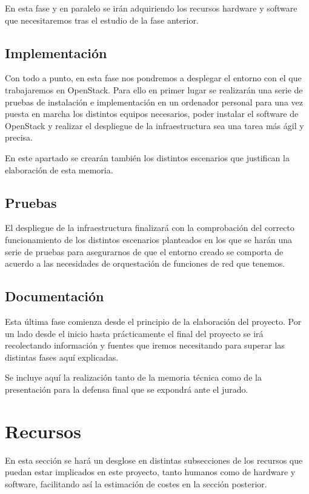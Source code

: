 En esta fase y en paralelo se irán adquiriendo los recursos hardware y software que necesitaremos tras el estudio de la fase anterior.

\subsection{Implementación}
Con todo a punto, en esta fase nos pondremos a desplegar el entorno con el que trabajaremos en OpenStack. Para ello en primer lugar se realizarán una serie de pruebas de instalación e implementación en un ordenador personal para una vez puesta en marcha los distintos equipos necesarios, poder instalar el software de OpenStack y realizar el despliegue de la infraestructura sea una tarea más ágil y precisa.

En este apartado se crearán también los distintos escenarios que justifican la elaboración de esta memoria.


\subsection{Pruebas}
El despliegue de la infraestructura finalizará con la comprobación del correcto funcionamiento de los distintos escenarios planteados en los que se harán una serie de pruebas para asegurarnos de que el entorno creado se comporta de acuerdo a las necesidades de orquestación de funciones de red que tenemos.

\subsection{Documentación}
Esta última fase comienza desde el principio de la elaboración del proyecto. Por un lado desde el inicio hasta prácticamente el final del proyecto se irá recolectando información y fuentes que iremos necesitando para superar las distintas fases aquí explicadas.

Se incluye aquí la realización tanto de la memoria técnica como de la presentación para la defensa final que se expondrá ante el jurado.

\section{Recursos}
En esta sección se hará un desglose en distintas subsecciones de los recursos que puedan estar implicados en este proyecto, tanto humanos como de hardware y software, facilitando así la estimación de costes en la sección posterior.

